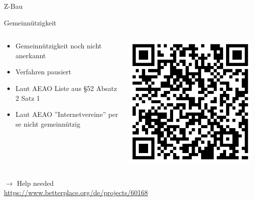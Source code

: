 \begin{frame}{Z-Bau}
{    }
\end{frame}

\begin{frame}{Gemeinnützigkeit}
    \begin{columns}[T]
        \begin{column}{0.6\textwidth}
            \begin{itemize}
                \item Gemeinnützigkeit noch nicht anerkannt
                \item Verfahren pausiert
                \item Laut AEAO Liste aus §52 Absatz 2 Satz 1
                \item Laut AEAO ''Internetvereine'' per se nicht gemeinnützig
            \end{itemize}
        \end{column}
        \begin{column}{0.35\textwidth}
            \includegraphics[width=\textwidth]{img/betterplace}
        \end{column}
    \end{columns}

    \vfill

    $\rightarrow$ Help needed\\
    \url{https://www.betterplace.org/de/projects/60168}

    \vfill
\end{frame}

